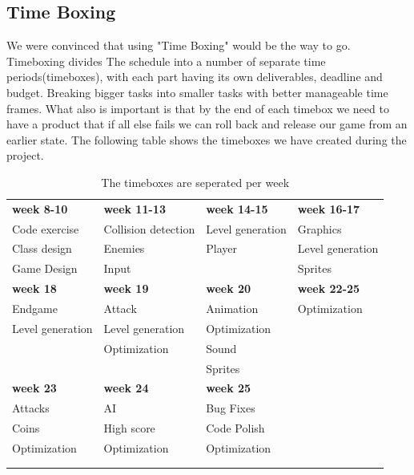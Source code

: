 \subsection{Time Boxing} %
We were convinced that using "Time Boxing" would be the way to go. Timeboxing divides The schedule into a number of separate time periods(timeboxes), with each part having its own deliverables, deadline and budget. Breaking bigger tasks into smaller tasks with better manageable time frames. What also is important is that by the end of each timebox we need to have a product that if all else fails we can roll back and release our game from an earlier state. The following table shows the timeboxes we have created during the project.
\begin{table}[h]
\begin{tabular}{llll}
  \rowcolor[HTML]{BBDAFF}
  \textbf{week 8-10}	& \textbf{week 11-13}	& \textbf{week 14-15}	& \textbf{week 16-17}	\\
  Code exercise			& Collision detection	& Level generation		& Graphics				\\
  Class design			& Enemies				& Player				& Level generation		\\
  Game Design			& Input					& 						& Sprites				\\
  \rowcolor[HTML]{BBDAFF} 
  \textbf{week 18}		& \textbf{week 19}		& \textbf{week 20}		& \textbf{week 22-25}	\\
  Endgame				& Attack				& Animation				& Optimization			\\
  Level generation		& Level generation		& Optimization			& 						\\
  						& Optimization			& Sound					& 						\\
  						& 						& Sprites 				& 						\\
  \textbf{week 23}		& \textbf{week 24}		& \textbf{week 25}		& 						\\
  Attacks				& AI					& Bug Fixes				& 						\\
  Coins					& High score			& Code Polish			& 						\\
  Optimization			& Optimization			& Optimization			& 						\\
  						& 						& 						& 						\\
  						& 						& 						& 						\\
\end{tabular}
\caption{The timeboxes are seperated per week}
\end{table}
\newpage

